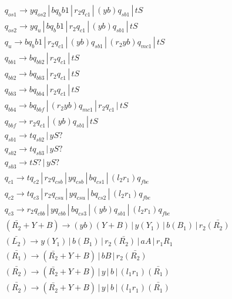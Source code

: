 \documentclass{article}
\begin{document}
\begin{mylist}
\begin{align*}
&q_{os1} \rightarrow yq_{os2} \, | \, b{q_bb1} \, | \, r_2q_{c1} \, | \, (yb)q_{sb1} \, | \, tS\\
&q_{os2} \rightarrow yq_{u} \, | \, b{q_bb1} \, | \, r_2q_{c1} \, | \, (yb)q_{sb1} \, | \, tS\\
&q_{u} \rightarrow b{q_bb1} \, | \, r_2q_{c1} \, | \,(yb)q_{sb1} \, | \, (r_2yb)q_{mc1} \, | \, tS\\
&q_{bb1} \rightarrow bq_{bb2} \, | \, r_2q_{c1} \, | \, tS \\ 
&q_{bb2} \rightarrow bq_{bb3} \, | \, r_2q_{c1} \, | \, tS \\ 
&q_{bb3} \rightarrow bq_{bb4} \, | \, r_2q_{c1} \, | \, tS \\ 
&q_{bb4} \rightarrow bq_{bbf} \, | \, (r_2yb)q_{mc1} \, | \, r_2q_{c1} \, | \, tS \\ 
&q_{bbf} \rightarrow r_2q_{c1} \, | \, (yb)q_{sb1} \, | \, tS \\ 
&q_{sb1} \rightarrow tq_{sb2} \, | \, yS? \\ 
&q_{sb2} \rightarrow tq_{sb3} \, | \, yS? \\ 
&q_{sb3} \rightarrow tS? \, | \, yS? \\ 
&q_{c1} \rightarrow tq_{c2} \, | \,  r_2q_{csb} \, | \, yq_{csb} \, | \, bq_{cs1} \, | \, (l_2r_1)q_{fbe}\\ 
&q_{c2} \rightarrow tq_{c3} \, | \,  r_2q_{csu} \, | \, yq_{csu} \, | \, bq_{cs2} \, | \, (l_2r_1)q_{fbe}\\ 
&q_{c3} \rightarrow r_2q_{cbb} \, | \,  yq_{cbb} \, | \, bq_{cs3} \, | \, (yb)q_{sb1} \, | \, (l_2r_1)q_{fbe}\\ 
&(\bar{R_2}+Y+B) \rightarrow (yb)(Y+B) \, | \, y(Y_1) \, | \, b(B_1) \, | \, r_2\bar{(R_2)} \\
&\bar{(L_2)} \rightarrow y(Y_1) \, | \, b(B_1) \, | \, r_2\bar{(R_2)} \, | \, aA \, | \, r_1R_1 \\
&\bar{(R_1)} \rightarrow (\bar{R_2}+Y+B) \, | \, bB \, | \, r_2\bar{(R_2)} \\
&\bar{(R_2)} \rightarrow (\bar{R_2}+Y+B) \, | \, y \, | \, b \, | \, (l_1r_1)\bar{(R_1)} \\ 
&\bar{(R_2)} \rightarrow (\bar{R_2}+Y+B) \, | \, y \, | \, b \, | \, (l_1r_1)\bar{(R_1)} \\
\end{align*}


\end{mylist}
\end{document}
